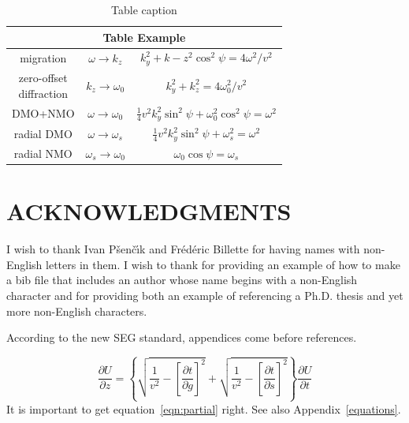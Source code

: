 \documentclass[manuscript,endfloat]{geophysics}
\begin{document}
\begin{table}
  \centering
  \begin{tabular}{|c|c|c|}
    \hline
    \multicolumn{3}{|c|}{Table Example} \\
    \hline
    migration\rule[-2ex]{0ex}{5ex} & 
    $\omega \rightarrow k_z$ & $k_y^2+k-z^2\cos^2 \psi=4\omega^2/v^2$ \\
    \hline
    \parbox{1in}{zero-offset\\diffraction}\rule[-4ex]{0ex}{8ex} &
    $k_z\rightarrow\omega_0$ &
    $k_y^2+k_z^2=4\omega_0^2/v^2$ \\
    \hline
    DMO+NMO\rule[-2ex]{0in}{5ex} & $\omega\rightarrow\omega_0$ & $\frac{1}{4}
    v^2k_y^2\sin^2\psi+\omega_0^2\cos^2\psi=\omega^2$ \\
    \hline
    radial DMO\rule[-2ex]{0in}{5ex} & $\omega\rightarrow\omega_s$ &
    $\frac{1}{4}v^2k_y^2\sin^2\psi+\omega_s^2=\omega^2$\\
    \hline
    radial NMO\rule[-2ex]{0in}{5ex} & $\omega_s\rightarrow\omega_0$ &
    $\omega_0\cos\psi=\omega_s$\\
    \hline
  \end{tabular}
  \caption{Table caption}
  \label{tbl:example}
\end{table}

\section{ACKNOWLEDGMENTS}

I wish to thank Ivan P\v{s}en\v{c}\'{\i}k and Fr\'ed\'eric Billette for having
names with non-English letters in them.  I wish to thank \cite{Cerveny} for
providing an example of how to make a bib file that includes an author
whose name begins with a non-English character and \cite{forgues96} for
providing both an example of referencing a Ph.D. thesis and yet more
non-English characters.


According to the new SEG standard, appendices come before references.

\begin{equation}
\frac{\partial U}{\partial z} = 
\left\{
  \sqrt{\frac{1}{v^2} - \left[\frac{\partial t}{\partial g}\right]^2} +
  \sqrt{\frac{1}{v^2} - \left[\frac{\partial t}{\partial s}\right]^2}
\right\}
\frac{\partial U}{\partial t}
\label{eqn:partial}
\end{equation}
It is important to get equation~\ref{eqn:partial} right. See also
Appendix~\ref{equations}.
\end{document}
